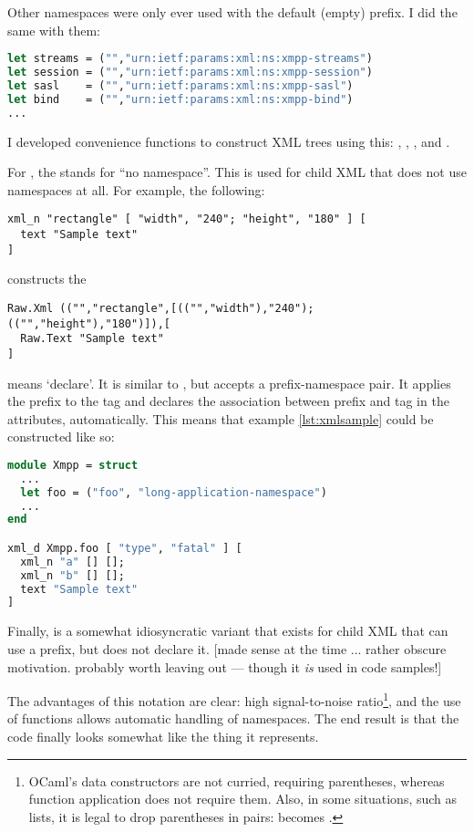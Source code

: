 \documentclass[12pt,a4paper,twoside,openright]{report}
\begin{document}
{Other namespaces were only ever used with the default (empty) prefix. I did the same with them:

\begin{lstlisting}[language=ml]
let streams = ("","urn:ietf:params:xml:ns:xmpp-streams")
let session = ("","urn:ietf:params:xml:ns:xmpp-session")
let sasl    = ("","urn:ietf:params:xml:ns:xmpp-sasl")
let bind    = ("","urn:ietf:params:xml:ns:xmpp-bind")
...
\end{lstlisting}

I developed convenience functions to construct XML trees using this: , , , and .

For , the  stands for ``no namespace''. This is used for child XML that does not use namespaces at all. For example, the following:
\begin{lstlisting}
xml_n "rectangle" [ "width", "240"; "height", "180" ] [
  text "Sample text"
]
\end{lstlisting} constructs the 
\begin{lstlisting}
Raw.Xml (("","rectangle",[(("","width"),"240"); (("","height"),"180")]),[
  Raw.Text "Sample text"
]
\end{lstlisting}

 means `declare'. It is similar to , but accepts a prefix-namespace pair. It applies the prefix to the tag and declares the association between prefix and tag in the attributes, automatically. This means that example \ref{lst:xmlsample} could be constructed like so:

\begin{lstlisting}[language=ml]
module Xmpp = struct
  ...
  let foo = ("foo", "long-application-namespace")
  ...
end

xml_d Xmpp.foo [ "type", "fatal" ] [
  xml_n "a" [] [];
  xml_n "b" [] [];
  text "Sample text"
]
\end{lstlisting}

Finally,  is a somewhat idiosyncratic variant that exists for child XML that can use a prefix, but does not declare it. [made sense at the time ... rather obscure motivation. probably worth leaving out --- though it \emph{is} used in code samples!]

The advantages of this notation are clear: high signal-to-noise ratio\footnote{OCaml's data constructors are not curried, requiring parentheses, whereas function application does not require them. Also, in some situations, such as lists, it is legal to drop parentheses in pairs: \code{[ (x,y); (z,w) ]} becomes \code{[ x,y; z,w ]}.}, and the use of functions allows automatic handling of namespaces. The end result is that the code finally looks somewhat like the thing it represents.

}
\end{document}
